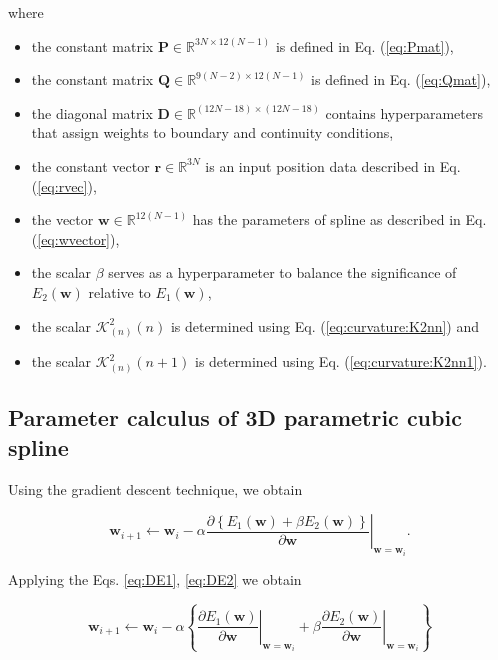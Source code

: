 where 
\begin{itemize}
\item the constant matrix $\mathbf{P} \in \mathbb{R}^{3N\times 12(N-1)}$ is defined in Eq. (\ref{eq:Pmat}),
\item the constant matrix $\mathbf{Q} \in \mathbb{R}^{9(N-2)\times 12(N-1)}$ is defined in Eq. (\ref{eq:Qmat}),
\item the diagonal matrix $\mathbf{D} \in \mathbb{R}^{(12N-18)\times (12N-18)}$ contains hyperparameters that assign weights to boundary and continuity conditions,
\item the constant vector $\mathbf{r} \in \mathbb{R}^{3N}$ is an input position data described in Eq. (\ref{eq:rvec}),
\item the vector $\mathbf{w} \in \mathbb{R}^{12(N-1)}$ has the parameters of spline as described in Eq. (\ref{eq:wvector}),
\item the scalar $\beta$ serves as a hyperparameter to balance the significance of $E_{2}(\mathbf{w})$ relative to $E_{1}(\mathbf{w})$,
\item the scalar $\mathcal{K}_{(n)}^{2}(n)$ is determined using Eq. (\ref{eq:curvature:K2nn}) and 
\item the scalar $\mathcal{K}_{(n)}^{2}(n+1)$ is determined using Eq. (\ref{eq:curvature:K2nn1}).
\end{itemize}
\subsection{Parameter calculus of 3D parametric cubic spline}
\label{sec:solvecubicspline}
Using the gradient descent technique, we obtain

\begin{equation}
\mathbf{w}_{i+1}
\leftarrow 
\mathbf{w}_{i}
-
\alpha
\left.
\frac{\partial 
\left\{
E_{1}(\mathbf{w})+\beta E_{2}(\mathbf{w})
\right\}
}{\partial \mathbf{w}}
\right|_{\mathbf{w}=\mathbf{w}_{i}}.
\end{equation}

Applying the Eqs. \ref{eq:DE1}, \ref{eq:DE2} we obtain

\begin{equation}
\mathbf{w}_{i+1}
\leftarrow 
\mathbf{w}_{i}
-
\alpha
\left\{
\left.
\frac{\partial E_{1}(\mathbf{w})}{\partial \mathbf{w}}
\right|_{\mathbf{w}=\mathbf{w}_{i}}
+
\beta
\left.
\frac{\partial E_{2}(\mathbf{w})}{\partial \mathbf{w}}
\right|_{\mathbf{w}=\mathbf{w}_{i}}
\right\}
\end{equation}

